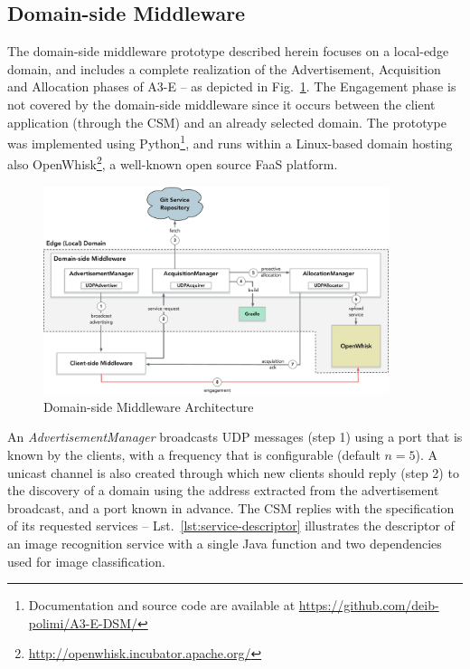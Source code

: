 \subsection{Domain-side Middleware}

The domain-side middleware prototype described herein focuses on a local-edge domain, and includes a complete realization of the Advertisement, Acquisition and Allocation phases of A3-E -- as depicted in Fig.~\ref{fig:domain-prototype}. The Engagement phase is not covered by the domain-side middleware since it occurs between the client application (through the CSM) and an already selected domain. The prototype was implemented using Python\footnote{Documentation and source code are available at \url{https://github.com/deib-polimi/A3-E-DSM/}}, and runs within a Linux-based domain hosting also OpenWhisk\footnote{\url{http://openwhisk.incubator.apache.org/}}, a well-known open source FaaS platform. 


\begin{figure}[tbp]
	\includegraphics[width=0.9\textwidth]{figs/a3e-domain-prototype}
	\caption{Domain-side Middleware Architecture}
	\label{fig:domain-prototype}
\end{figure}

An \textit{AdvertisementManager} broadcasts UDP messages (step 1) using a port that is known by the clients, with a frequency that is configurable (default $n=5$). A unicast channel is also created through which new clients should reply (step 2) to the discovery of a domain using the address extracted from the advertisement broadcast, and a port known in advance. The CSM replies with the specification of its requested services -- Lst.~\ref{lst:service-descriptor} illustrates the descriptor of an image recognition service with a single Java function and two dependencies used for image classification.

